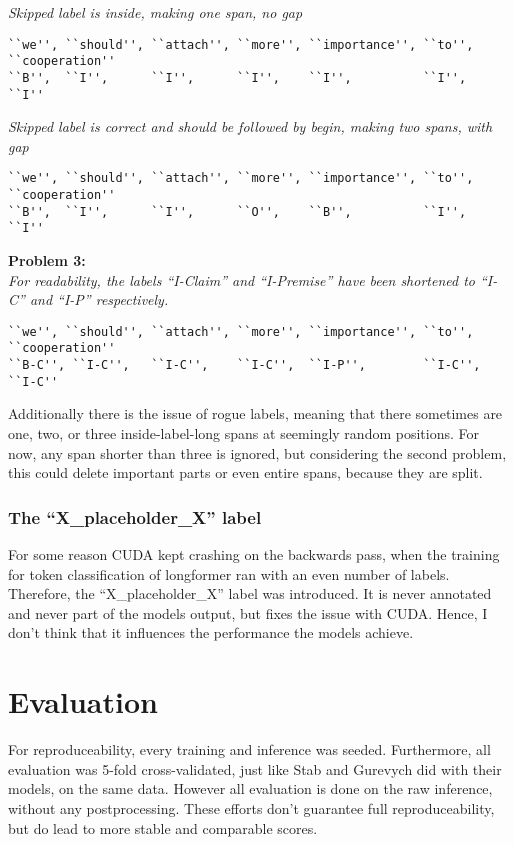 \documentclass[12]{article}
\theoremstyle{mytheoremstyle}
\theoremstyle{mytheoremstyle}
\theoremstyle{myproblemstyle}
\begin{document}
  \vspace{-4ex}
  \textit{Skipped label is inside, making one span, no gap}
  \vspace{-1.5ex}
  \begin{verbatim}
``we'', ``should'', ``attach'', ``more'', ``importance'', ``to'', ``cooperation''
``B'',  ``I'',      ``I'',      ``I'',    ``I'',          ``I'',  ``I''
  \end{verbatim}
  \vspace{-4ex}
  \textit{Skipped label is correct and should be followed by begin, making two spans, with gap}
  \vspace{-1.5ex}
  \begin{verbatim}
``we'', ``should'', ``attach'', ``more'', ``importance'', ``to'', ``cooperation''
``B'',  ``I'',      ``I'',      ``O'',    ``B'',          ``I'',  ``I''
  \end{verbatim}
  \vspace{-4ex}
  \textbf{Problem 3:}\\
  \textit{For readability, the labels ``I-Claim'' and ``I-Premise'' have been shortened to ``I-C'' and ``I-P'' respectively.}
  \vspace{-1.5ex}
  \begin{verbatim}
``we'', ``should'', ``attach'', ``more'', ``importance'', ``to'', ``cooperation''
``B-C'', ``I-C'',   ``I-C'',    ``I-C'',  ``I-P'',        ``I-C'', ``I-C''
  \end{verbatim}
  \vspace{-4ex}
  Additionally there is the issue of rogue labels, meaning that there sometimes are one, two, or three inside-label-long spans at seemingly random positions. 
  For now, any span shorter than three is ignored, but considering the second problem, this could delete important parts or even entire spans, because they are split.
  \subsubsection{The ``X\_placeholder\_X'' label} \label{the placeholder label}
  For some reason CUDA kept crashing on the backwards pass, when the training for token classification of longformer ran with an even number of labels. 
  Therefore, the ``X\_placeholder\_X'' label was introduced. 
  It is never annotated and never part of the models output, but fixes the issue with CUDA. 
  Hence, I don't think that it influences the performance the models achieve.

  \section{Evaluation\dotfill}
  For reproduceability, every training and inference was seeded. 
  Furthermore, all evaluation was 5-fold cross-validated, just like Stab and Gurevych did with their models, on the same data. 
  However all evaluation is done on the raw inference, without any postprocessing.
  These efforts don't guarantee full reproduceability, but do lead to more stable and comparable scores.
\end{document}
